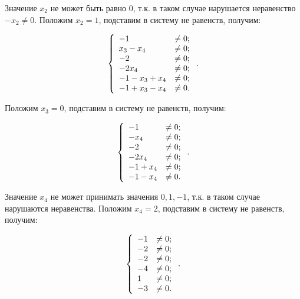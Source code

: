 \documentclass[14pt]{mmcs-article}
\begin{document}
Значение $x_2$ не может быть равно $0$, т.к. в таком случае нарушается неравенство $- x_2 \neq 0$. Положим $x_2 = 1$, подставим в систему не равенств, получим:

\begin{equation}
    \centering
    \left\{
        \begin{array}{ll}
            - 1 &\neq 0             ; \\
            x_3 - x_4 &\neq 0       ; \\
            - 2 &\neq 0             ; \\
            - 2 x_4 &\neq 0         ; \\
            - 1 - x_3 + x_4 &\neq 0 ; \\
            - 1 + x_3 - x_4 &\neq 0 . \\
        \end{array}
    \right..
    \label{eqs:cycle_search_neqs}
\end{equation}

Положим $x_3 = 0$, подставим в систему не равенств, получим:

\begin{equation}
    \centering
    \left\{
        \begin{array}{ll}
            - 1 &\neq 0       ; \\
            - x_4 &\neq 0     ; \\
            - 2 &\neq 0       ; \\
            - 2 x_4 &\neq 0   ; \\
            - 1 + x_4 &\neq 0 ; \\
            - 1 - x_4 &\neq 0 . \\
        \end{array}
    \right..
    \label{eqs:cycle_search_neqs}
\end{equation}

Значение $x_4$ не может принимать значения $0, 1, -1$, т.к. в таком случае нарушаются неравенства. Положим $x_4 = 2$, подставим в систему не равенств, получим:

\begin{equation}
    \centering
    \left\{
        \begin{array}{ll}
            - 1 &\neq 0   ; \\
            - 2 &\neq 0   ; \\
            - 2 &\neq 0   ; \\
            - 4 &\neq 0   ; \\
            1 &\neq 0     ; \\
            - 3 &\neq 0   . \\
        \end{array}
    \right..
    \label{eqs:cycle_search_neqs}
\end{equation}
\end{document}
